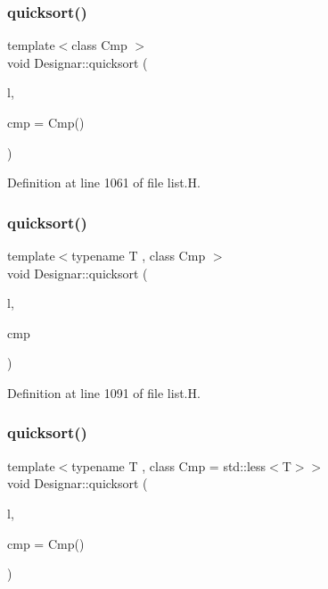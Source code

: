 \subsubsection{\texorpdfstring{quicksort()}{quicksort()}\hspace{0.1cm}{\footnotesize\ttfamily [5/14]}}
{\footnotesize\ttfamily template$<$class Cmp $>$ \\
void Designar\+::quicksort (\begin{DoxyParamCaption}\item[{\hyperlink{class_designar_1_1_d_l}{DL} \&}]{l,  }\item[{Cmp \&\&}]{cmp = {\ttfamily Cmp()} }\end{DoxyParamCaption})\hspace{0.3cm}{\ttfamily [inline]}}



Definition at line 1061 of file list.\+H.

\mbox{\label{namespace_designar_a5e44455a1442b74351b0fb9f9519581f}} 
\subsubsection{\texorpdfstring{quicksort()}{quicksort()}\hspace{0.1cm}{\footnotesize\ttfamily [6/14]}}
{\footnotesize\ttfamily template$<$typename T , class Cmp $>$ \\
void Designar\+::quicksort (\begin{DoxyParamCaption}\item[{\hyperlink{class_designar_1_1_d_l_node}{D\+L\+Node}$<$ T $>$ \&}]{l,  }\item[{Cmp \&}]{cmp }\end{DoxyParamCaption})\hspace{0.3cm}{\ttfamily [inline]}}



Definition at line 1091 of file list.\+H.

\mbox{\label{namespace_designar_a5a756296262619dd1deb6195ad0ec2a0}} 
\subsubsection{\texorpdfstring{quicksort()}{quicksort()}\hspace{0.1cm}{\footnotesize\ttfamily [7/14]}}
{\footnotesize\ttfamily template$<$typename T , class Cmp  = std\+::less$<$\+T$>$$>$ \\
void Designar\+::quicksort (\begin{DoxyParamCaption}\item[{\hyperlink{class_designar_1_1_d_l_node}{D\+L\+Node}$<$ T $>$ \&}]{l,  }\item[{Cmp \&\&}]{cmp = {\ttfamily Cmp()} }\end{DoxyParamCaption})\hspace{0.3cm}{\ttfamily [inline]}}



